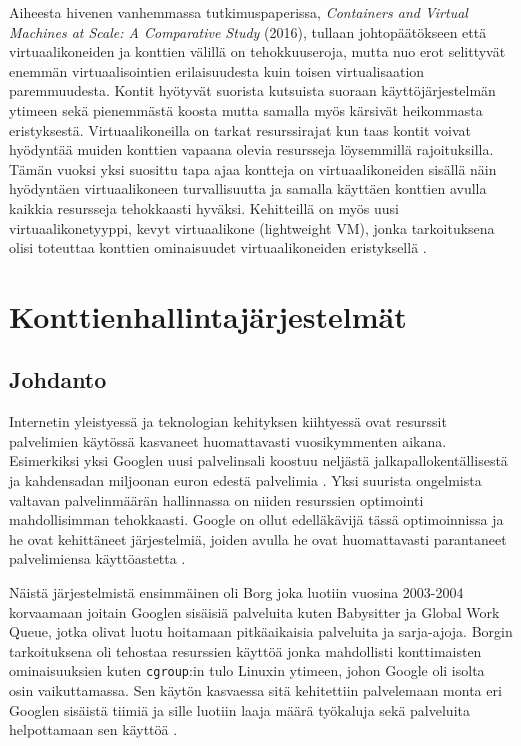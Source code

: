 \documentclass[finnish,gradu]{tktltiki3}
\begin{document}
Aiheesta hivenen vanhemmassa tutkimuspaperissa, \textit{Containers and Virtual Machines at Scale: A Comparative Study} (2016), tullaan johtopäätökseen että virtuaalikoneiden ja konttien välillä on tehokkuuseroja, mutta nuo erot selittyvät enemmän virtuaalisointien erilaisuudesta kuin toisen virtualisaation paremmuudesta. Kontit hyötyvät suorista kutsuista suoraan käyttöjärjestelmän ytimeen sekä pienemmästä koosta mutta samalla myös kärsivät heikommasta eristyksestä. Virtuaalikoneilla on tarkat resurssirajat kun taas kontit voivat hyödyntää muiden konttien vapaana olevia resursseja löysemmillä rajoituksilla. Tämän vuoksi yksi suosittu tapa ajaa kontteja on virtuaalikoneiden sisällä näin hyödyntäen virtuaalikoneen turvallisuutta ja samalla käyttäen konttien avulla kaikkia resursseja tehokkaasti hyväksi. Kehitteillä on myös uusi virtuaalikonetyyppi, kevyt virtuaalikone (lightweight VM),  jonka tarkoituksena olisi toteuttaa konttien ominaisuudet virtuaalikoneiden eristyksellä \cite{containers-vms-study}.

\section{Konttienhallintajärjestelmät}

\subsection{Johdanto}

Internetin yleistyessä ja teknologian kehityksen kiihtyessä ovat resurssit palvelimien käytössä kasvaneet huomattavasti vuosikymmenten aikana. Esimerkiksi yksi Googlen uusi palvelinsali koostuu neljästä jalkapallokentällisestä ja kahdensadan miljoonan euron edestä palvelimia \cite{borg-goto-youtube}. Yksi suurista ongelmista valtavan palvelinmäärän hallinnassa on niiden resurssien optimointi mahdollisimman tehokkaasti. Google on ollut edelläkävijä tässä optimoinnissa ja he ovat kehittäneet järjestelmiä, joiden avulla he ovat huomattavasti parantaneet palvelimiensa käyttöastetta \cite{borg-omega-kubernetes}.

Näistä järjestelmistä ensimmäinen oli Borg joka luotiin vuosina 2003-2004 korvaamaan joitain Googlen sisäisiä palveluita kuten Babysitter ja Global Work Queue, jotka olivat luotu hoitamaan pitkäaikaisia palveluita ja sarja-ajoja. Borgin tarkoituksena oli tehostaa resurssien käyttöä jonka mahdollisti konttimaisten ominaisuuksien kuten \texttt{cgroup}:in tulo Linuxin ytimeen, johon Google oli isolta osin vaikuttamassa. Sen käytön kasvaessa sitä kehitettiin palvelemaan monta eri Googlen sisäistä tiimiä ja sille luotiin laaja määrä työkaluja sekä palveluita helpottamaan sen käyttöä
\cite{borg-omega-kubernetes}.
\end{document}
